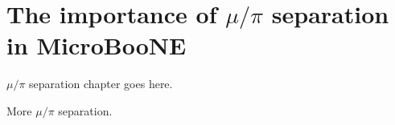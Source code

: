 \chapter{The importance of $\mu/\pi$ separation in MicroBooNE}\label{ch:mupi}
$\mu/\pi$ separation chapter goes here.

\clearpage

More $\mu/\pi$ separation.
